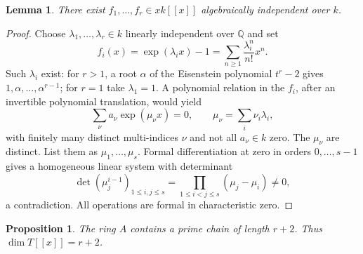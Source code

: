 \documentclass[11pt,reqno]{amsart}
\numberwithin{equation}{section}
\theoremstyle{plain}
\newtheorem{proposition}[theorem]{Proposition}
\newtheorem{lemma}[theorem]{Lemma}
\theoremstyle{definition}
\theoremstyle{remark}
\begin{document}
\begin{lemma}\label{lem:exponentials}
There exist $f_1,\ldots,f_r\in xk[[x]]$ algebraically
independent over $k$.
\end{lemma}

\begin{proof}
Choose $\lambda_1,\ldots,\lambda_r\in k$ linearly independent
over $\mathbb Q$ and set
\[
 f_i(x)=\exp(\lambda_i x)-1
       =\sum_{n\ge1}\frac{\lambda_i^n}{n!}x^n.
\]
Such $\lambda_i$ exist: for $r>1$, a root $\alpha$ of the
Eisenstein polynomial $t^r-2$ gives $1,\alpha,\ldots,\alpha^{r-1}$;
for $r=1$ take $\lambda_1=1$.
A polynomial relation in the $f_i$, after an invertible polynomial
translation, would yield
\[
 \sum_{\nu}a_\nu\exp(\mu_\nu x)=0,
 \qquad \mu_\nu=\sum_i\nu_i\lambda_i,
\]
with finitely many distinct multi-indices $\nu$ and not all
$a_\nu\in k$ zero. The $\mu_\nu$ are distinct. List them as
$\mu_1,\ldots,\mu_s$. Formal differentiation at zero in orders
$0,\ldots,s-1$ gives a homogeneous linear system with determinant
\[
 \det(\mu_j^{i-1})_{1\le i,j\le s}
   =\prod_{1\le i<j\le s}(\mu_j-\mu_i)\ne0,
\]
a contradiction. All operations are formal in characteristic zero.
\end{proof}

\begin{proposition}\label{prop:lower}
The ring $A$ contains a prime chain of length $r+2$.
Thus $\dim T[[x]]=r+2$.
\end{proposition}
\end{document}
